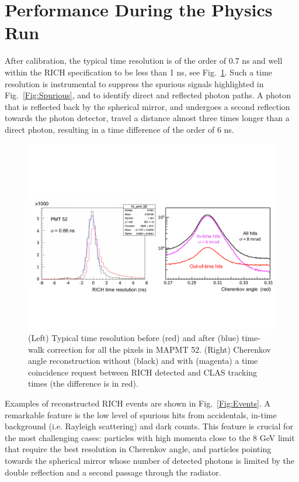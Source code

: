 \documentclass[final,5p,times,twocolumn]{elsarticle}
\begin{document}
\section{Performance During the Physics Run}

After calibration, the typical time resolution is of the order of 0.7 ns and well within the RICH specification 
to be less than 1 ns, see Fig.~\ref{Fig:Resos}. Such a time resolution is instrumental to suppress the spurious signals highlighted in 
Fig.~\ref{Fig:Spurious}, and to identify direct and reflected photon paths. A photon that is reflected back by 
the spherical mirror, and undergoes a second reflection towards the photon detector, travel a distance almost
three times longer than a direct photon, resulting in a time difference of the order of 6 ns. 

\begin{figure}[t]
\begin{center}
\includegraphics[width=1.0\columnwidth]{EPS/Figure8.pdf}
\end{center}
\caption{(Left) Typical time resolution before (red) and after (blue) time-walk correction for all the pixels in 
MAPMT 52. (Right) Cherenkov angle reconstruction without (black) and with (magenta) a time coincidence request 
between RICH detected and CLAS tracking times (the difference is in red).}
\label{Fig:Resos}
\end{figure}

Examples of reconstructed RICH events are shown in Fig.~\ref{Fig:Events}. A remarkable feature is the low level
of spurious hits from accidentals, in-time background (i.e. Rayleigh scattering) and dark counts. This feature
is crucial for the most challenging cases: particles with high momenta close to the 8 GeV limit that require
the best resolution in Cherenkov angle, and particles pointing towards the spherical mirror whose number of
detected photons is limited by the double reflection and a second passage through the radiator. 
\end{document}
